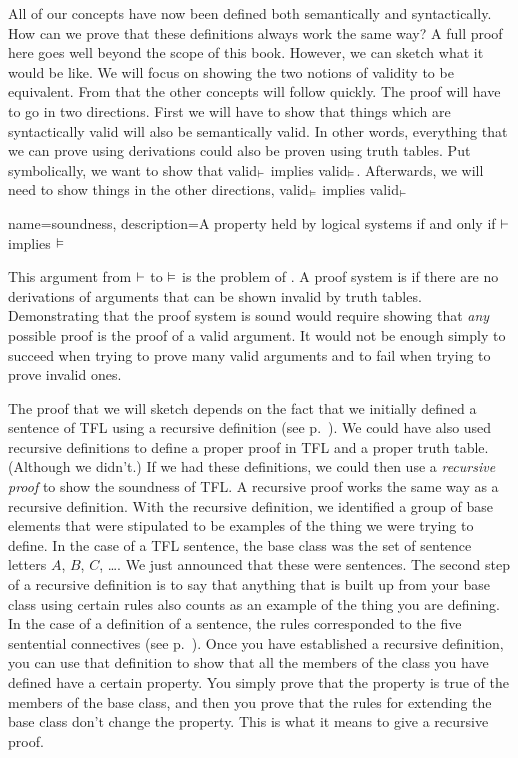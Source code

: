 All of our concepts have now been defined both semantically and syntactically. How can we prove that these definitions always work the same way? A full proof here goes well beyond the scope of this book. However, we can sketch what it would be like. We will focus on showing the two notions of validity to be equivalent.  From that the other concepts will follow quickly. The proof will have to go in two directions. First we will have to show that things which are syntactically valid will also be semantically valid. In other words, everything that we can prove using derivations could also be proven using truth tables. Put symbolically, we want to show that valid$_{\vdash}$ implies valid$_{\vDash}$. Afterwards, we will need to show things in the other directions,  valid$_{\vDash}$ implies valid$_{\vdash}$

{
name=soundness,
description={A property held by logical systems if and only if $\vdash $ implies $\vDash $}
}

This argument from $\vdash $ to $\vDash $ is the problem of . \label{def:soundness} A proof system is  if there are no derivations of arguments that can be shown invalid by truth tables. \label{def_Soundness} Demonstrating that the proof system is sound would require showing that \emph{any} possible proof is the proof of a valid argument. It would not be enough simply to succeed when trying to prove many valid arguments and to fail when trying to prove invalid ones.

The proof that we will sketch depends on the fact that we initially defined a sentence of TFL using a recursive definition (see p.~\pageref{TFLsentences}). We could have also used recursive definitions to define a proper proof in TFL and a proper truth table. (Although we didn't.) If we had these definitions, we could then use a \emph{recursive proof} to show the soundness of TFL. A recursive proof works the same way as a recursive definition. With the recursive definition, we identified a group of base elements that were stipulated to be examples of the thing we were trying to define. In the case of a TFL sentence, the base class was the set of sentence letters $A$, $B$, $C$, \dots. We just announced that these were sentences. The second step of a recursive definition is to say that anything that is built up from your base class using certain rules also counts as an example of the thing you are defining. In the case of a definition of a sentence, the rules corresponded to the five sentential connectives (see p.~\pageref{TFLsentences}). Once you have established a recursive definition, you can use that definition to show that all the members of the class you have defined have a certain property. You simply prove that the property is true of the members of the base class, and then you prove that the rules for extending the base class don't change the property. This is what it means to give a recursive proof.

